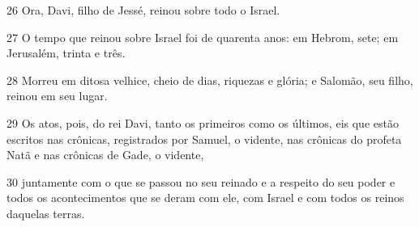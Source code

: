\par 26 Ora, Davi, filho de Jessé, reinou sobre todo o Israel.
\par 27 O tempo que reinou sobre Israel foi de quarenta anos: em Hebrom, sete; em Jerusalém, trinta e três.
\par 28 Morreu em ditosa velhice, cheio de dias, riquezas e glória; e Salomão, seu filho, reinou em seu lugar.
\par 29 Os atos, pois, do rei Davi, tanto os primeiros como os últimos, eis que estão escritos nas crônicas, registrados por Samuel, o vidente, nas crônicas do profeta Natã e nas crônicas de Gade, o vidente,
\par 30 juntamente com o que se passou no seu reinado e a respeito do seu poder e todos os acontecimentos que se deram com ele, com Israel e com todos os reinos daquelas terras.


